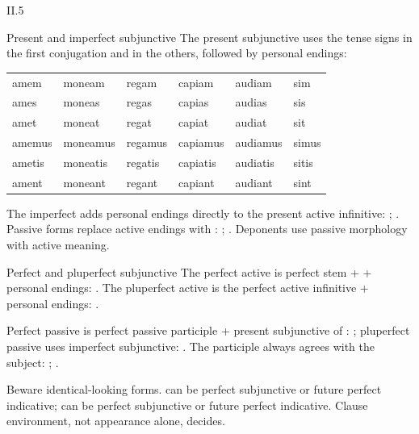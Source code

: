 \begin{courseunit}{II.5}
\begin{grammarbox}{Present and imperfect subjunctive}
The present subjunctive uses the tense signs  in the first conjugation and
 in the others, followed by personal endings:

\begin{center}
\begin{tabular}{@{}llllll@{}}
\toprule
\Latin{amare} & \Latin{monere} & \Latin{regere} & \Latin{capere} & \Latin{audire} &
\Latin{esse}\\ \midrule
amem & moneam & regam & capiam & audiam & sim\\
ames & moneas & regas & capias & audias & sis\\
amet & moneat & regat & capiat & audiat & sit\\
amemus & moneamus & regamus & capiamus & audiamus & simus\\
ametis & moneatis & regatis & capiatis & audiatis & sitis\\
ament & moneant & regant & capiant & audiant & sint\\
\bottomrule
\end{tabular}
\end{center}

The imperfect adds personal endings directly to the present active infinitive:
; .  Passive forms replace active endings with
: ;
.  Deponents use passive morphology with active meaning.
\end{grammarbox}

\begin{grammarbox}{Perfect and pluperfect subjunctive}
The perfect active is perfect stem +  + personal endings:
.  The pluperfect
active is the perfect active infinitive + personal endings:
.

Perfect passive is perfect passive participle + present subjunctive of :
; pluperfect passive uses imperfect subjunctive:
.  The participle always agrees with the subject:
; .

Beware identical-looking forms.   can be perfect subjunctive or future perfect
indicative;  can be perfect subjunctive or future perfect indicative.
Clause environment, not appearance alone, decides.
\end{grammarbox}


\end{courseunit}
